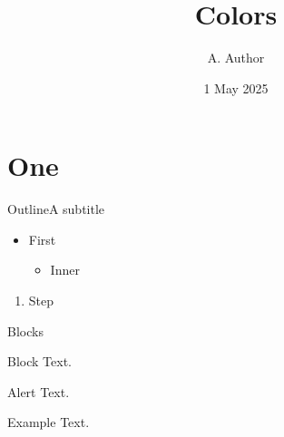 \documentclass{beamer}
\title{Colors}
\author{A. Author}
\institute{Institute}
\date{1 May 2025}
\begin{document}
\begin{frame}
\titlepage
\end{frame}
\section{One}
\begin{frame}{Outline}{A subtitle}
\tableofcontents
\begin{itemize}
\item First
\begin{itemize}
\item Inner
\end{itemize}
\end{itemize}
\begin{enumerate}
\item Step
\end{enumerate}
\end{frame}
\begin{frame}{Blocks}
\begin{block}{Block}
Text.
\end{block}
\begin{alertblock}{Alert}
Text.
\end{alertblock}
\begin{exampleblock}{Example}
Text.
\end{exampleblock}
\end{frame}
\end{document}

